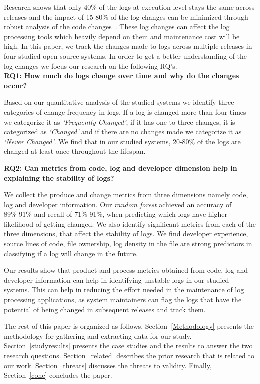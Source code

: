 Research shows that only 40\% of the logs at execution level stays the same across releases and the impact of 15-80\% of the log changes can be minimized through robust analysis of the code changes~\cite{IanWCRE}. These log changes can affect the log processing tools which heavily depend on them and maintenance cost will be high. In this paper, we track the changes made to logs across multiple releases in four studied open source systems. In order to get a better understanding of the log changes we focus our research on the following RQ's.\\


\textbf{RQ1:} \textbf{How much do logs change over time and why do the changes occur?}

Based on our quantitative analysis of the studied systems we identify three categories of change frequency in logs. If a log is changed more than four times we categorize it as \textsl{`Frequently Changed'}, if it has one to three changes, it is categorized as \textsl{`Changed'} and if there are no changes made we categorize it as \textsl{`Never Changed'}. We find that in our studied systems, 20-80\% of the logs are changed at least once throughout the lifespan.


\textbf{RQ2:} \textbf{Can metrics from code, log and developer dimension help in explaining the stability of logs?}

We collect the produce and change metrics from three dimensions namely code, log and developer information. Our \textsl{random forest} achieved an accuracy of 89\%-91\% and recall of 71\%-91\%, when predicting which logs have higher likelihood of getting changed. We also identify significant metrics from each of the three dimensions, that affect the stability of logs. We find  developer experience, source lines of code, file ownership, log density in the file are strong predictors in classifying if a log will change in the future. 
 
 
 Our results show that product and process metrics obtained from code, log and developer information can help in identifying unstable logs in our studied systems. This can help in reducing the effort needed in the maintenance of log processing applications, as system maintainers can flag the logs that have the potential of being changed in subsequent releases and track them. 
 
The rest of this paper is organized as follows. Section~\ref{Methodology} presents the methodology for gathering and extracting data for our study. Section~\ref{studyresults} presents the case studies and the results to answer the two research questions. Section~\ref{related} describes the prior research that is related to our work. Section~\ref{threats} discusses the threats to validity. Finally, Section~\ref{conc} concludes the paper.
 
 

